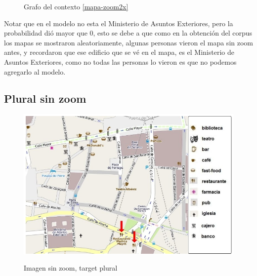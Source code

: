 \begin{figure}[ht]
\caption{Grafo del contexto \ref{mapa-zoom2x}}
\label{modelo-mapa-zoom2x}
\end{figure}

Notar que en el modelo no esta el Ministerio de Asuntos Exteriores, pero la probabilidad di\'o mayor que 0, esto se debe a que como en la obtenci\'on del corpus los mapas se mostraron aleatoriamente, algunas personas vieron el mapa sin zoom antes, y recordaron que ese edificio que se v\'e en el mapa, es el Ministerio de Asuntos Exteriores, como no todas las personas lo vieron es que no podemos agregarlo al modelo.


\subsection{Plural sin zoom}

\begin{figure}
\centering
\includegraphics[width=\textwidth]{images/corpus/mapa10.png}\\[0pt]
\caption{Imagen sin zoom, target plural}
\label{mapa-zoom-plural}
\end{figure}

